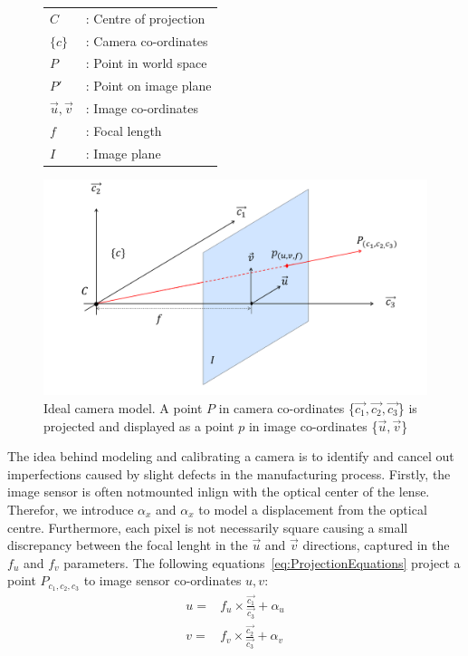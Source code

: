 \documentclass{UoNMCHA}
\numberwithin{equation}{section}
\begin{document}
\begin{figure}[ht]
	\begin{minipage}[c]{0.3\linewidth}
		\centering
		\begin{tabular}{l l}
			$C$ &: Centre of projection\\
			$\{c\}$ &: Camera co-ordinates\\
			$P$ &: Point in world space\\
			$P'$ &: Point on image plane\\
			$\vec{u}, \vec{v}$ &: Image co-ordinates\\
			$f$ &: Focal length\\
			$I$ &: Image plane
		\end{tabular}
	\end{minipage}
	\begin{minipage}[c]{0.65\linewidth}
		\includegraphics[width=1\linewidth]{Figures/Planar_Model}	
	\end{minipage}
\caption{Ideal camera model. A point $P$ in camera co-ordinates \{$\vec{c_{1}}, \vec{c_{2}}, \vec{c_{3}}$\} is projected and displayed as a point $p$ in image co-ordinates \{$\vec{u}, \vec{v}$\}}
\label{fig:PlainarModel}
\end{figure}
The idea behind modeling and calibrating a camera is to identify and cancel out imperfections caused by slight defects in the manufacturing process. Firstly, the image sensor is often notmounted inlign with the optical center of the lense. Therefor, we introduce $\alpha_{x}$ and $\alpha_{x}$ to model a displacement from the optical centre. Furthermore, each pixel is not necessarily square causing a small discrepancy between the focal lenght in the $\vec{u}$ and $\vec{v}$ directions, captured in the $f_{u}$ and $f_{v}$ parameters. The following equations~\ref{eq:ProjectionEquations} project a point $P_{c_{1}, c_{2}, c_{3}}$ to image sensor co-ordinates $u, v$:
\begin{equation*}\label{eq:ProjectionEquations}
	\begin{split}
		u = &f_{u} \times \frac{\vec{c_{1}}}{\vec{c_{3}}} + \alpha_{u}\\
		v = &f_{v} \times \frac{\vec{c_{2}}}{\vec{c_{3}}} + \alpha_{v}
	\end{split}
\end{equation*}
\end{document}
